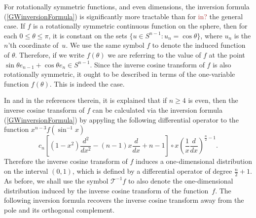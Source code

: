 \documentclass{article}[1100]
\newtheorem{lemma}[theorem]{Lemma}
\theoremstyle{definition}
\theoremstyle{remark}
\newcommand\testFunctionSpace{C_e^\infty(\sphere{n-1})}
\newcommand\sphere[1]{S^{#1}}
\newcommand{\CT}{\mathcal T}
\newcommand{\inverseCT}{{\mathcal T}^{-1}}
\begin{document}
\medskip

For rotationally symmetric functions, and even dimensions, the inversion formula 
 (\ref{GWinversionFormula}) is significantly more tractable than for \textcolor{brown}{in?} the general case. If $f$ is a rotationally symmetric  continuous function on the sphere, then
for each $0\leq\theta\leq\pi$, it is constant on the sets $\{u\in\sphere{n-1}: u_n=\cos\theta\}$, where $u_n$ is the $n$'th coordinate of~$u$.
 We use the same symbol $f$ to denote the induced function of $\theta$. Therefore, if we write $f(\theta)$ we are referring
 to the value of $f$ at the point $\sin\theta e_{n-1}+\cos\theta e_n\in\sphere{n-1}$. Since the inverse cosine transform of $f$ is also rotationally symmetric,  it ought to be described in terms of the one-variable function $f(\theta)$.   This is indeed the case.
 
 \medskip
 
In  \cite{LonkeDegreeOf} and in the references therein, it is explained that if $n\geq 4$ is even, then the inverse cosine transform of $f$  can be calculated via the inversion formula (\ref{GWinversionFormula}) by appyling the following differential operator to the function $x^{n-3}f(\sin^{-1}x)$
\begin{equation}\label{differentialOperator}
c_n\left [(1-x^2)\frac{d^2}{dx^2}-(n-1)x\frac{d}{dx}+n-1\right]\circ x\left (\frac{1}{x}\frac{d}{dx}\right)^{\frac{n}{2}-1}.
\end{equation}
Therefore the inverse cosine transform of $f$ induces a one-dimensional  distribution on the interval $(0,1)$, which is defined by a differential operator
of degree ${\frac{n}{2}+1}$. As before, we shall use the symbol $\inverseCT f$ to also denote the one-dimensional distribution induced by the inverse cosine transform of the function~$f$. The following inversion formula recovers the inverse cosine transform
away from the pole and its orthogonal complement.
\end{document}
